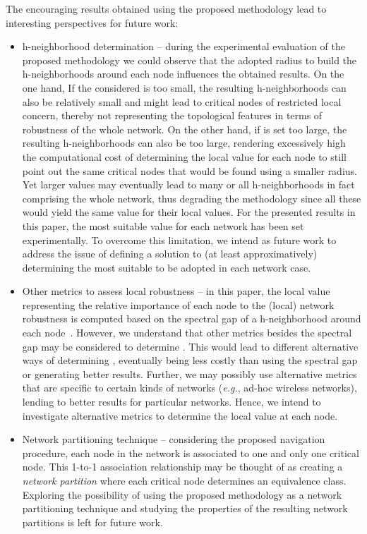 \documentclass[conference,fleqn]{IEEEtran}
\begin{document}
The encouraging results obtained using the proposed methodology lead to interesting
perspectives for future work:

\begin{itemize}

\item h-neighborhood determination -- during the experimental evaluation of the proposed methodology we could observe that the adopted 
radius to build the h-neighborhoods around each node influences the obtained results. 
On the one hand, If the considered  is too small, the resulting h-neighborhoods can also be relatively small
and might lead to critical nodes of restricted local concern, thereby not representing the topological features
in terms of robustness of the whole network. On the other hand, if  is set too large, the resulting h-neighborhoods 
can also be too large, rendering excessively high the computational cost of determining the local value  for each node 
 to still point out the same critical nodes that would be found using a smaller radius. Yet larger  values may
eventually lead to many or all h-neighborhoods in fact comprising the whole network, thus degrading the methodology
since all these would yield the same value for their local  values.
For the presented results in this paper, the most suitable  value for each network has been set experimentally. 
To overcome this limitation, we intend as future work to address the issue of defining a solution to (at least approximatively) 
determining the most suitable  to be adopted in each network case. 

\item Other metrics to assess local robustness -- in this paper, the local  value representing the relative importance of 
each node  to the (local) network robustness is computed based on the spectral gap of a h-neighborhood around each
node~. However, we understand that other metrics besides the spectral gap may be considered to 
determine . This would lead to different alternative ways of determining , 
eventually being less costly than using the spectral gap or generating better results.
Further, we may possibly use alternative metrics that are specific to certain kinds of networks (\textit{e.g.}, ad-hoc 
wireless networks), lending to better results for particular networks. Hence, we intend to investigate
alternative metrics to determine the local  value at each node.

\item Network partitioning technique -- considering the proposed navigation procedure, each node in the network is
associated to one and only one critical node. This 1-to-1 association relationship 
may be thought of as creating a \emph{network partition} where each critical node determines an equivalence class.
Exploring the possibility of using the proposed methodology as a network partitioning technique and studying the
properties of the resulting network partitions is left for future work.

\end{itemize} 
\end{document}
